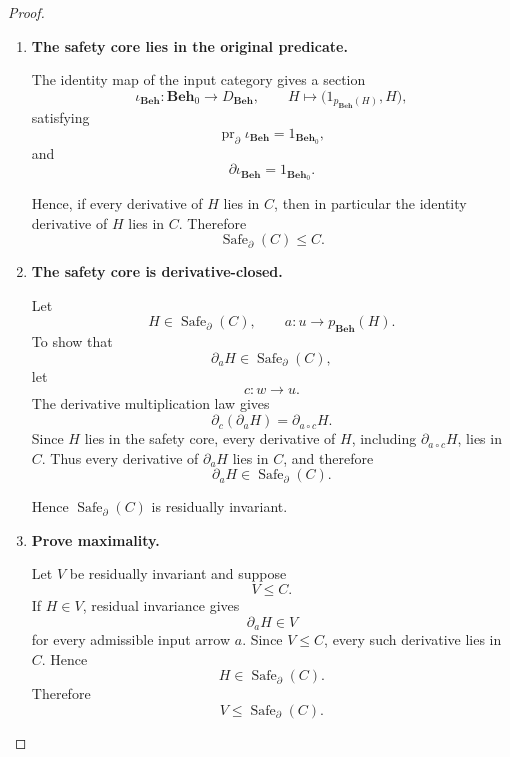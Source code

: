 \begin{proof}
    \leavevmode
    \begin{enumerate}
        \item \textbf{The safety core lies in the original predicate.}

        The identity map of the input category gives a section
        \[
            \iota_{\mathbf{Beh}}:
            \mathbf{Beh}_0\to D_{\mathbf{Beh}},
            \qquad
            H\longmapsto
            \bigl(
                1_{p_{\mathbf{Beh}}(H)},
                H
            \bigr),
        \]
        satisfying
        \[
            \operatorname{pr}_{\partial}
            \iota_{\mathbf{Beh}}
            =
            1_{\mathbf{Beh}_0},
        \]
        and
        \[
            \partial\iota_{\mathbf{Beh}}
            =
            1_{\mathbf{Beh}_0}.
        \]

        Hence, if every derivative of \(H\) lies in \(C\), then in particular
        the identity derivative of \(H\) lies in \(C\). Therefore
        \[
            \operatorname{Safe}_\partial(C)\leq C.
        \]

        \item \textbf{The safety core is derivative-closed.}

        Let
        \[
            H\in\operatorname{Safe}_\partial(C),
            \qquad
            a:u\to p_{\mathbf{Beh}}(H).
        \]
        To show that
        \[
            \partial_aH
            \in
            \operatorname{Safe}_\partial(C),
        \]
        let
        \[
            c:w\to u.
        \]
        The derivative multiplication law gives
        \[
            \partial_c(\partial_aH)
            =
            \partial_{a\circ c}H.
        \]
        Since \(H\) lies in the safety core, every derivative of \(H\),
        including \(\partial_{a\circ c}H\), lies in \(C\). Thus every
        derivative of \(\partial_aH\) lies in \(C\), and therefore
        \[
            \partial_aH
            \in
            \operatorname{Safe}_\partial(C).
        \]

        Hence \(\operatorname{Safe}_\partial(C)\) is residually invariant.

        \item \textbf{Prove maximality.}

        Let \(V\) be residually invariant and suppose
        \[
            V\leq C.
        \]
        If \(H\in V\), residual invariance gives
        \[
            \partial_aH\in V
        \]
        for every admissible input arrow \(a\). Since \(V\leq C\), every such
        derivative lies in \(C\). Hence
        \[
            H\in\operatorname{Safe}_\partial(C).
        \]
        Therefore
        \[
            V\leq\operatorname{Safe}_\partial(C).
        \]


\end{enumerate}
\end{proof}
